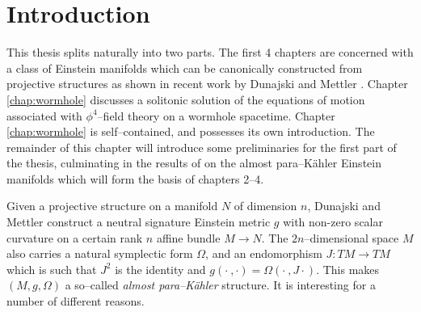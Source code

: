 

\chapter{Introduction}\label{chap:intro}


This thesis splits naturally into two parts. The first 4 chapters are concerned with a class of Einstein manifolds which can be canonically constructed from projective structures as shown in recent work by Dunajski and Mettler \cite{DM}. Chapter \ref{chap:wormhole} discusses a solitonic solution of the equations of motion associated with $\phi^4$--field theory on a wormhole spacetime. Chapter \ref{chap:wormhole} is self--contained, and possesses its own introduction. The remainder of this chapter will introduce some preliminaries for the first part of the thesis, culminating in the results of \cite{DM} on the almost para--K\"ahler Einstein manifolds which will form the basis of chapters 2--4.



Given a projective structure on a manifold $N$ of dimension $n$,
Dunajski and Mettler \cite{DM} construct a neutral signature Einstein metric $g$ with non-zero
scalar curvature on a certain rank $n$ affine bundle $M\rightarrow N$.
The $2n$--dimensional space $M$ also carries a natural symplectic form $\Omega$, and
an endomorphism $J:TM\rightarrow TM$ which is such that $J^2$ is the identity and $g(\cdot\ ,\cdot)=\Omega(\cdot\ ,J\cdot)$. This makes $(M,g,\Omega)$ a so--called \textit{almost para--K\"ahler} structure. It is interesting for a number of different reasons.

